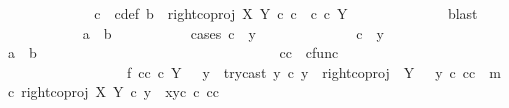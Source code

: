 \begin{isabellebody}
\ \ \ \ \ \ \ \ \ \ \isamarkupfalse%
\ \isamarkupfalse%
\ c\ \ c{\isacharunderscore}{\kern0pt}def{\isacharcolon}{\kern0pt}\ {\isachardoublequoteopen}b\ {\isacharequal}{\kern0pt}\ right{\isacharunderscore}{\kern0pt}coproj\ X\ Y\ {\isasymcirc}\isactrlsub c\ c\ {\isasymand}\ c\ {\isasymin}\isactrlsub c\ Y{\isachardoublequoteclose}\isanewline
\ \ \ \ \ \ \ \ \ \ \ \ \isamarkupfalse%
\ blast\ \ \isanewline
\ \ \ \ \ \ \ \ \ \ \isamarkupfalse%
\ {\isachardoublequoteopen}a\ {\isacharequal}{\kern0pt}\ b{\isachardoublequoteclose}\isanewline
\ \ \ \ \ \ \ \ \ \ \isamarkupfalse%
{\isacharparenleft}{\kern0pt}cases\ {\isachardoublequoteopen}c\ {\isacharequal}{\kern0pt}\ y{}{\isachardoublequoteclose}{\isacharparenright}{\kern0pt}\isanewline
\ \ \ \ \ \ \ \ \ \ \ \ \isamarkupfalse%
\ {\isachardoublequoteopen}c\ {\isacharequal}{\kern0pt}\ y{}{\isachardoublequoteclose}\ \isanewline
\ \ \ \ \ \ \ \ \ \ \ \ \isamarkupfalse%
\ {\isachardoublequoteopen}a\ {\isacharequal}{\kern0pt}\ b{\isachardoublequoteclose}\isanewline
\ \ \ \ \ \ \ \ \ \ \ \ \ \ \isamarkupfalse%
\ {\isacharminus}{\kern0pt}\isanewline
\ \ \ \ \ \ \ \ \ \ \ \ \ \ \ \ \isamarkupfalse%
\ cc\ {\isacharcolon}{\kern0pt}{\isacharcolon}{\kern0pt}\ cfunc\ \isanewline
\ \ \ \ \ \ \ \ \ \ \ \ \ \ \ \ \ \ f{}{\isacharcolon}{\kern0pt}\ {\isachardoublequoteopen}cc\ {\isasymin}\isactrlsub c\ Y\ {\isasymsetminus}\ {\isacharparenleft}{\kern0pt}{\isasymone}{\isacharcomma}{\kern0pt}\ y{}{\isacharparenright}{\kern0pt}\ {\isasymand}\ try{\isacharunderscore}{\kern0pt}cast\ y{}\ {\isasymcirc}\isactrlsub c\ y\ {\isacharequal}{\kern0pt}\ right{\isacharunderscore}{\kern0pt}coproj\ {\isasymone}\ {\isacharparenleft}{\kern0pt}Y\ {\isasymsetminus}\ {\isacharparenleft}{\kern0pt}{\isasymone}{\isacharcomma}{\kern0pt}\ y{}{\isacharparenright}{\kern0pt}{\isacharparenright}{\kern0pt}\ {\isasymcirc}\isactrlsub c\ cc\ {\isasymand}\ m\ {\isasymcirc}\isactrlsub c\ right{\isacharunderscore}{\kern0pt}coproj\ X\ Y\ {\isasymcirc}\isactrlsub c\ y\ {\isacharequal}{\kern0pt}\ {\isasymlangle}x{}{\isacharcomma}{\kern0pt}y{}\isactrlsup c\ {\isasymcirc}\isactrlsub c\ cc{\isasymrangle}{\isachardoublequoteclose}\isanewline
\ \ \ \ \ \ \ \ \ \ \ \ \ \ \ \ \ \ \isamarkupfalse%

\end{isabellebody}
